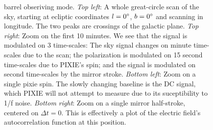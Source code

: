 \documentclass{article}
\begin{document}
\begin{figure}
{	barrel obseriving mode. \emph{Top left}: A whole great-circle
	scan of the sky, starting at ecliptic coordinates $l=0\degree$,
	$b=0\degree$ and scanning in longitude. The two peaks are crossings
	of the galactic plane. \emph{Top right}: Zoom on the first 10 minutes.
	We see that the signal is modulated on 3 time-scales: The sky signal
	changes on minute time-scales due to the scan; the polarization is
	modulated on 15 second time-scales due to PIXIE's spin; and the
	signal is modulated on second time-scales by the mirror stroke.
	\emph{Bottom left}: Zoom on a single pixie spin. The slowly
	changing baseline is the DC signal, which PIXIE will not attempt
	to measure due to its suceptibility to 1/f noise. \emph{Bottom
	right}: Zoom on a single mirror half-stroke, centered on
	$\Delta t=0$. This is effectively a plot of the electric field's
	autocorrelation function at this position.}
\end{figure}
\end{document}

